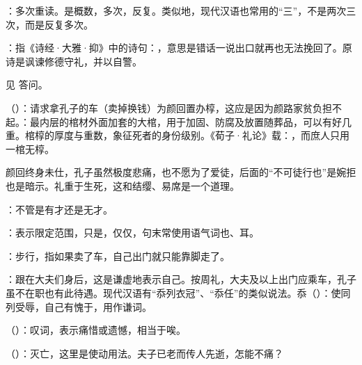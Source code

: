 {
\item {}：多次重读。是概数，多次，反复。类似地，现代汉语也常用的“三”，不是两次三次，而是反复多次。
\item {}：指《诗经·大雅·抑》中的诗句：，意思是错话一说出口就再也无法挽回了。原诗是讽谏修德守礼，并以自警。
}
{}


{见  答问。}
{}


{
\item {}（）：请求拿孔子的车（卖掉换钱）为颜回置办椁，这应是因为颜路家贫负担不起。：最内层的棺材外面加套的大棺，用于加固、防腐及放置随葬品，可以有好几重。棺椁的厚度与重数，象征死者的身份级别。《荀子·礼论》载：，而庶人只用一棺无椁。

颜回终身未仕，孔子虽然极度悲痛，也不愿为了爱徒，后面的“不可徒行也”是婉拒也是暗示。礼重于生死，这和结缨、易席是一个道理。
\item {}：不管是有才还是无才。
\item {}：表示限定范围，只是，仅仅，句末常使用语气词也、耳。
\item {}：步行，指如果卖了车，自己出门就只能靠脚走了。
\item {}：跟在大夫们身后，这是谦虚地表示自己。按周礼，大夫及以上出门应乘车，孔子虽不在职也有此待遇。现代汉语有“忝列衣冠”、“忝任”的类似说法。忝（）：使同列受辱，自己有愧于，用作谦词。
}
{}


{
\item {}（）：叹词，表示痛惜或遗憾，相当于唉。
\item {}（）：灭亡，这里是使动用法。夫子已老而传人先逝，怎能不痛？ %
}
{}



